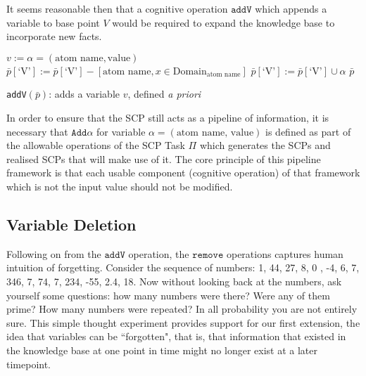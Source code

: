 It seems reasonable then that a cognitive operation $\texttt{addV}$ which appends a variable to base point $V$ would be required to expand the knowledge base to incorporate new facts.

\begin{algorithm}[H] 
\SetAlgoLined
{}
$v:= \alpha=(\text{atom name},\text{value})$\;
{
$\bar{p}[\textrm{`V'}]:=\bar{p}[\textrm{`V'}] - [\text{atom name}, x \in \text{Domain}_\text{atom name}] $\;
$\bar{p}[\textrm{`V'}]:=\bar{p}[\textrm{`V'}] \cup \alpha$\;
\Return $\bar{p}$
}

\caption{\texttt{addV}$(\bar{p})$: adds a variable $v$, defined \textit{a priori}}
\label{cogOp:addV}
\end{algorithm}

In order to ensure that the SCP still acts as a pipeline of information, it is necessary that $\texttt{Add}\alpha$ for variable $\alpha=(\text{atom name, value})$ is defined as part of the allowable operations of the SCP Task $\Pi$ which generates the SCPs and realised SCPs that will make use of it. The core principle of this pipeline framework is that each usable component (cognitive operation) of that framework which is not the input value should not be modified.

\subsection{Variable Deletion} \label{ssec:deletion}
Following on from the $\texttt{addV}$ operation, the $\texttt{remove}$ operations captures human intuition of forgetting. Consider the sequence of numbers: 1, 44, 27, 8, 0 , -4, 6, 7, 346, 7, 74, 7, 234, -55, 2.4, 18. Now without looking back at the numbers, ask yourself some questions: how many numbers were there? Were any of them prime? How many numbers were repeated? In all probability you are not entirely sure. This simple thought experiment provides support for our first extension, the idea that variables can be ``forgotten", that is, that information that existed in the knowledge base at one point in time might no longer exist at a later timepoint. 

